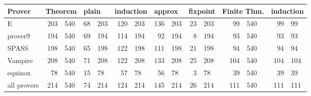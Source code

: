
%
%
%

\begin{tabular}{l || r@{/}l | r@{/}l | r@{/}l | r@{/}l | r@{/}l || r@{/}l | r@{/}l}
Prover & \multicolumn{2}{l|}{Theorem} & \multicolumn{2}{l|}{plain} & \multicolumn{2}{l|}{induction} & \multicolumn{2}{l|}{approx} & \multicolumn{2}{l||}{fixpoint} & \multicolumn{2}{l|}{Finite Thm.} & \multicolumn{2}{l|}{induction} \\
\hline
E           & 203&540 & 68&203 & 120&203 & 136&203 & 23&203 &  99&540 &  99&99\\
prover9     & 194&540 & 69&194 & 114&194 &  92&194 &  8&194 &  93&540 &  93&93\\
SPASS       & 198&540 & 65&198 & 122&198 & 111&198 & 21&198 &  94&540 &  94&94\\
Vampire     & 208&540 & 71&208 & 122&208 & 133&208 & 25&208 & 104&540 & 104&104\\
equinox     &  78&540 & 15&78  &  57&78  &  56&78  &  3&78  &  39&540 &  39&39\\
\hline
all provers & 214&540 & 74&214 & 124&214 & 145&214 & 26&214 & 111&540 & 111&111\\
\hline
\end{tabular}

%
